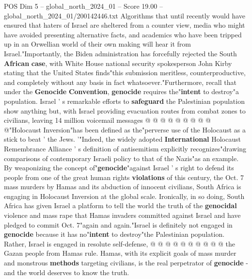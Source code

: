 \begin{textsample}{POS Dim 5 – global\_north\_2024\_01 – Score 19.00 – global\_north\_2024\_01/200142446.txt}
Algorithms that until recently would have ensured that haters of Israel are sheltered from a counter view, media who might have avoided presenting alternative facts, and academics who have been tripped up in an Orwellian world of their own making will hear it from Israel."Importantly, the Biden administration has forcefully rejected the South \textbf{African} \textbf{case}, with White House national security spokesperson John Kirby stating that the United States finds"this submission meritless, counterproductive, and completely without any basis in fact whatsoever."Furthermore, recall that under the \textbf{Genocide} \textbf{Convention}, \textbf{genocide} requires the"\textbf{intent} to destroy"a population.
Israel ' s remarkable efforts to \textbf{safeguard} the Palestinian population show anything but, with Israel providing evacuation routes from combat zones to civilians, leaving 14 million voicemail messages @ @ @ @ @ @ @ @ @ @"Holocaust Inversion"has been defined as the"perverse use of the Holocaust as a stick to beat ' the Jews. '"Indeed, the widely adopted \textbf{International} Holocaust Remembrance Alliance ' s definition of antisemitism explicitly recognizes"drawing comparisons of contemporary Israeli policy to that of the Nazis"as an example.
By weaponizing the concept of"\textbf{genocide}"against Israel ' s right to defend its people from one of the great human rights \textbf{violations} of this century, the Oct. 7 mass murders by Hamas and its abduction of innocent civilians, South Africa is engaging in Holocaust Inversion at the global scale.
Ironically, in so doing, South Africa has given Israel a platform to tell the world the truth of the \textbf{genocidal} violence and mass rape that Hamas invaders committed against Israel and have pledged to commit Oct. 7"again and again."Israel is definitely not engaged in \textbf{genocide} because it has no"\textbf{intent} to destroy"the Palestinian population.
Rather, Israel is engaged in resolute self-defense, @ @ @ @ @ @ @ @ @ @ the Gazan people from Hamas rule.
Hamas, with its explicit goals of mass murder and monstrous \textbf{methods} targeting civilians, is the real perpetrator of \textbf{genocide} - and the world deserves to know the truth.

\end{textsample}
